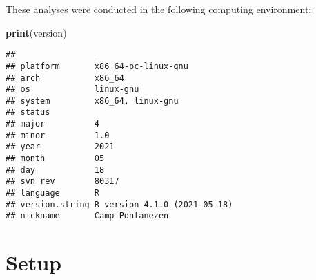 \documentclass[]{book}
\newenvironment{Shaded}{\begin{snugshade}}{\end{snugshade}}
\newcommand{\KeywordTok}[1]{\textcolor[rgb]{0.13,0.29,0.53}{\textbf{#1}}}
\newcommand{\NormalTok}[1]{#1}
\begin{document}
These analyses were conducted in the following computing environment:

\begin{Shaded}
\begin{Highlighting}[]
\KeywordTok{print}\NormalTok{(version)}
\end{Highlighting}
\end{Shaded}

\begin{verbatim}
##                _                           
## platform       x86_64-pc-linux-gnu         
## arch           x86_64                      
## os             linux-gnu                   
## system         x86_64, linux-gnu           
## status                                     
## major          4                           
## minor          1.0                         
## year           2021                        
## month          05                          
## day            18                          
## svn rev        80317                       
## language       R                           
## version.string R version 4.1.0 (2021-05-18)
## nickname       Camp Pontanezen
\end{verbatim}

\hypertarget{setup-2}{%
\section{Setup}\label{setup-2}}
\end{document}
